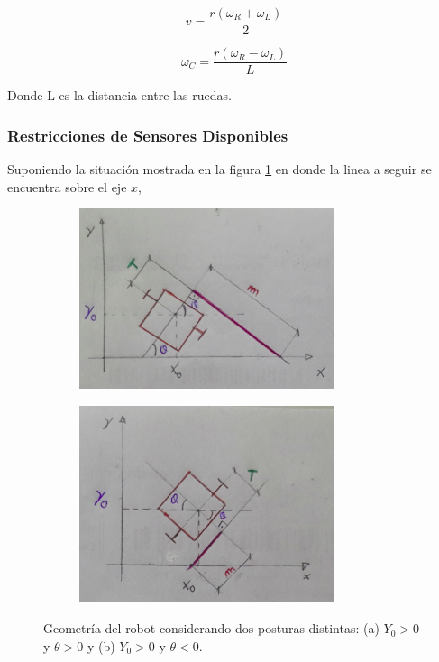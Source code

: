 \documentclass[10pt,conference,a4paper,onecolumn]{article}%
\begin{document}
\begin{equation*}
v=\frac{r(\omega _R + \omega _L)}{2}
\end{equation*}


\begin{equation}
\label{wc}
\omega_{C}=\frac{r(\omega _R - \omega _L) }{L}
\end{equation}

Donde L es la distancia entre las ruedas. 

\subsubsection{\color{red}Restricciones de Sensores Disponibles}%
\label{sec:modelo_orien}
Suponiendo la situación mostrada en la figura \ref{fig:posturas} en donde la linea a seguir se encuentra sobre el eje $x$, 

\begin{figure}[h]
\centering
    \begin{subfigure}[h]{0.45\textwidth}
    	\centering
        \includegraphics[width=7.5cm]{./imagenes/geometria_A.png}
        \caption{}
    \end{subfigure}
    \quad
    \begin{subfigure}[h]{0.45\textwidth}
    	\centering
        \includegraphics[width=7.5cm]{./imagenes/geometria_B.png}
        \caption{}
    \end{subfigure}
    \caption{Geometría del robot considerando dos posturas distintas: (a) $Y_0 >0 $ y $ \theta >0 $ y (b) $Y_0 >0$ y $ \theta <0$.}
	\label{fig:posturas}
\end{figure}
\end{document}
